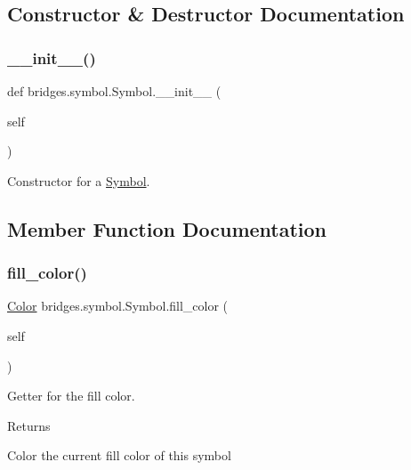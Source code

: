 \subsection{Constructor \& Destructor Documentation}
\mbox{\label{classbridges_1_1symbol_1_1_symbol_a57c7fcd41baccb9c2e15c9c828d957f6}} 
\subsubsection{\texorpdfstring{\_\_init\_\_()}{\_\_init\_\_()}}
{\footnotesize\ttfamily def bridges.\+symbol.\+Symbol.\+\_\+\+\_\+init\+\_\+\+\_\+ (\begin{DoxyParamCaption}\item[{}]{self }\end{DoxyParamCaption})}



Constructor for a \mbox{\hyperlink{classbridges_1_1symbol_1_1_symbol}{Symbol}}. 



\subsection{Member Function Documentation}
\mbox{\label{classbridges_1_1symbol_1_1_symbol_a6e33002ba21999d6858f6082fb510185}} 
\subsubsection{\texorpdfstring{fill\_color()}{fill\_color()}\hspace{0.1cm}{\footnotesize\ttfamily [1/2]}}
{\footnotesize\ttfamily  \mbox{\hyperlink{classbridges_1_1color_1_1_color}{Color}} bridges.\+symbol.\+Symbol.\+fill\+\_\+color (\begin{DoxyParamCaption}\item[{}]{self }\end{DoxyParamCaption})}



Getter for the fill color. 

\begin{DoxyReturn}{Returns}


Color the current fill color of this symbol 
\end{DoxyReturn}
\mbox{\label{classbridges_1_1symbol_1_1_symbol_a8b48b9062b234cb293e6915f9d801f68}} 
